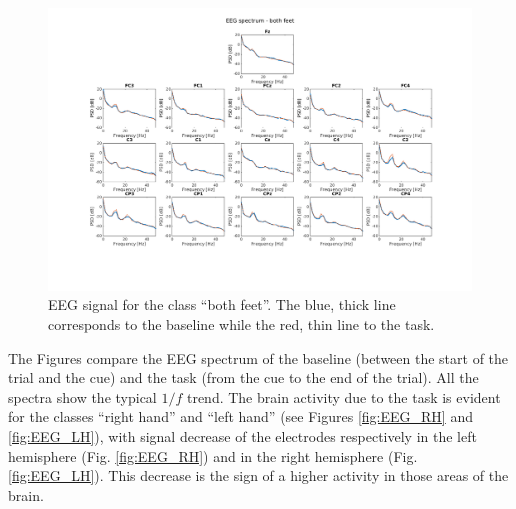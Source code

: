 \begin{figure}
   \centering
   \includegraphics[width=\textwidth]{images/EEG_BF.png}
   \caption{EEG signal for the class ``both feet''. The blue, thick line corresponds to the baseline while the red, thin line to the task.}
   \label{fig:EEG_BF}
\end{figure}
The Figures compare the EEG spectrum of the baseline (between the start of the trial and the cue) and the task (from the cue to the end of the trial).
All the spectra show the typical $1/f$ trend.
The brain activity due to the task is evident for the classes ``right hand'' and ``left hand'' (see Figures \ref{fig:EEG_RH} and \ref{fig:EEG_LH}), with signal decrease of the electrodes respectively in the left hemisphere (Fig. \ref{fig:EEG_RH}) and in the right hemisphere (Fig. \ref{fig:EEG_LH}).
This decrease is the sign of a higher activity in those areas of the brain.

